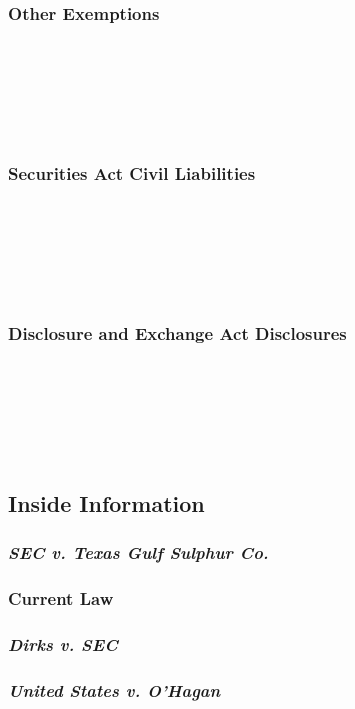 \subsubsection{Other Exemptions}

~\\\\\\\\\\

\subsubsection{Securities Act Civil Liabilities}

~\\\\\\\\\\

\subsubsection{Disclosure and Exchange Act Disclosures}

~\\\\\\\\\\

\subsection{Inside Information}

\subsubsection{\emph{SEC v. Texas Gulf Sulphur Co.}}


\subsubsection{Current Law}


\subsubsection{\emph{Dirks v. SEC}}


\subsubsection{\emph{United States v. O'Hagan}}

